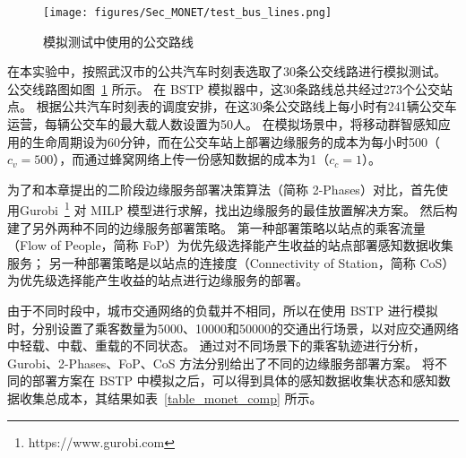 \begin{figure}[!b]
  \centering
  \texttt{[image: figures/Sec\_MONET/test\_bus\_lines.png]}
  \vspace{-0.5em}
  \caption{模拟测试中使用的公交路线}
  \label{Figure_test_bus_lines}
\end{figure}

在本实验中，按照武汉市的公共汽车时刻表选取了30条公交线路进行模拟测试。
公交线路图如图~\ref{Figure_test_bus_lines} 所示。
在 BSTP 模拟器中，这30条路线总共经过273个公交站点。
根据公共汽车时刻表的调度安排，在这30条公交路线上每小时有241辆公交车运营，每辆公交车的最大载人数设置为50人。
在模拟场景中，将移动群智感知应用的生命周期设为60分钟，而在公交车站上部署边缘服务的成本为每小时500（$c_v = 500$），而通过蜂窝网络上传一份感知数据的成本为1（$c_c = 1$）。

为了和本章提出的二阶段边缘服务部署决策算法（简称 2-Phases）对比，首先使用Gurobi~\footnote{https://www.gurobi.com} 对 MILP 模型进行求解，找出边缘服务的最佳放置解决方案。
然后构建了另外两种不同的边缘服务部署策略。
第一种部署策略以站点的乘客流量（Flow of People，简称 FoP）为优先级选择能产生收益的站点部署感知数据收集服务；
另一种部署策略是以站点的连接度（Connectivity of Station，简称 CoS）为优先级选择能产生收益的站点进行边缘服务的部署。

由于不同时段中，城市交通网络的负载并不相同，所以在使用 BSTP 进行模拟时，分别设置了乘客数量为5000、10000和50000的交通出行场景，以对应交通网络中轻载、中载、重载的不同状态。
通过对不同场景下的乘客轨迹进行分析，Gurobi、2-Phases、FoP、CoS 方法分别给出了不同的边缘服务部署方案。
将不同的部署方案在 BSTP 中模拟之后，可以得到具体的感知数据收集状态和感知数据收集总成本，其结果如表~\ref{table_monet_comp} 所示。

